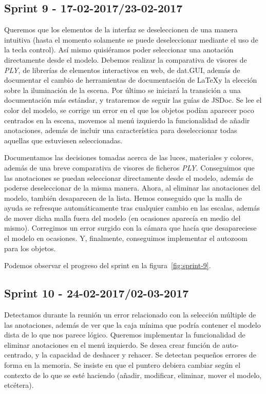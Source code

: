 \subsection{Sprint 9 - 17-02-2017/23-02-2017}
Queremos que los elementos de la interfaz se deseleccionen de una manera intuitiva (hasta el momento solamente se puede deseleccionar mediante el uso de la tecla control). Así mismo quisiéramos poder seleccionar una anotación directamente desde el modelo. Debemos realizar la comparativa de visores de \textit{PLY}, de librerías de elementos interactivos en web, de dat.GUI, además de documentar el cambio de herramientas de documentación de \LaTeX y la elección sobre la iluminación de la escena. Por último se iniciará la transición a una documentación más estándar, y trataremos de seguir las guías de JSDoc.
Se lee el color del modelo, se corrige un error en el que los objetos podían aparecer poco centrados en la escena, movemos al menú izquierdo la funcionalidad de añadir anotaciones, además de incluir una característica para deseleccionar todas aquellas que estuviesen seleccionadas.

Documentamos las decisiones tomadas acerca de las luces, materiales y colores, además de una breve comparativa de visores de ficheros \textit{PLY}. Conseguimos que las anotaciones se puedan seleccionar directamente desde el modelo, además de poderse deseleccionar de la misma manera. Ahora, al eliminar las anotaciones del modelo, también desaparecen de la lista. Hemos conseguido que la malla de ayuda se refresque automáticamente tras cualquier cambio en las escalas, además de mover dicha malla fuera del modelo (en ocasiones aparecía en medio del mismo). Corregimos un error surgido con la cámara que hacía que desapareciese el modelo en ocasiones. Y, finalmente, conseguimos implementar el autozoom para los objetos.

Podemos observar el progreso del sprint en la figura~\ref{fig:sprint-9}.

\subsection{Sprint 10 - 24-02-2017/02-03-2017}
Detectamos durante la reunión un error relacionado con la selección múltiple de las anotaciones, además de ver que la caja mínima que podría contener el modelo dista de lo que nos parece lógico. Queremos implementar la funcionalidad de eliminar anotaciones en el menú izquierdo. Se desea crear función de auto-centrado, y la capacidad de deshacer y rehacer. Se detectan pequeños errores de forma en la memoria. Se insiste en que el puntero debiera cambiar según el contexto de lo que se esté haciendo (añadir, modificar, eliminar, mover el modelo, etcétera).


